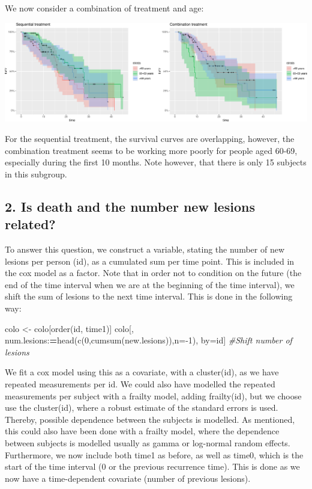 \documentclass[
  11pt,
]{article}
\newenvironment{Shaded}{\begin{snugshade}}{\end{snugshade}}
\newcommand{\AttributeTok}[1]{\textcolor[rgb]{0.77,0.63,0.00}{#1}}
\newcommand{\CommentTok}[1]{\textcolor[rgb]{0.56,0.35,0.01}{\textit{#1}}}
\newcommand{\DecValTok}[1]{\textcolor[rgb]{0.00,0.00,0.81}{#1}}
\newcommand{\ErrorTok}[1]{\textcolor[rgb]{0.64,0.00,0.00}{\textbf{#1}}}
\newcommand{\FunctionTok}[1]{\textcolor[rgb]{0.00,0.00,0.00}{#1}}
\newcommand{\NormalTok}[1]{#1}
\newcommand{\OtherTok}[1]{\textcolor[rgb]{0.56,0.35,0.01}{#1}}
\newcommand{\SpecialCharTok}[1]{\textcolor[rgb]{0.00,0.00,0.00}{#1}}
\begin{document}
We now consider a combination of treatment and age:

\includegraphics{Exam2021_PracticalPart_files/figure-latex/unnamed-chunk-9-1.pdf}

For the sequential treatment, the survival curves are overlapping,
however, the combination treatment seems to be working more poorly for
people aged 60-69, especially during the first 10 months. Note however,
that there is only 15 subjects in this subgroup.

\hypertarget{is-death-and-the-number-new-lesions-related}{%
\subsection{2. Is death and the number new lesions
related?}\label{is-death-and-the-number-new-lesions-related}}

To answer this question, we construct a variable, stating the number of
new lesions per person (id), as a cumulated sum per time point. This is
included in the cox model as a factor. Note that in order not to
condition on the future (the end of the time interval when we are at the
beginning of the time interval), we shift the sum of lesions to the next
time interval. This is done in the following way:

\begin{Shaded}
\begin{Highlighting}[]
\NormalTok{colo }\OtherTok{\textless{}{-}}\NormalTok{ colo[}\FunctionTok{order}\NormalTok{(id, time1)]}
\NormalTok{colo[, num.lesions}\SpecialCharTok{:}\ErrorTok{=}\FunctionTok{head}\NormalTok{(}\FunctionTok{c}\NormalTok{(}\DecValTok{0}\NormalTok{,}\FunctionTok{cumsum}\NormalTok{(new.lesions)),}\AttributeTok{n=}\SpecialCharTok{{-}}\DecValTok{1}\NormalTok{), by}\OtherTok{=}\NormalTok{id] }\CommentTok{\#Shift number of lesions}
\end{Highlighting}
\end{Shaded}

We fit a cox model using this as a covariate, with a cluster(id), as we
have repeated measurements per id. We could also have modelled the
repeated measurements per subject with a frailty model, adding
frailty(id), but we choose use the cluster(id), where a robust estimate
of the standard errors is used. Thereby, possible dependence between the
subjects is modelled. As mentioned, this could also have been done with
a frailty model, where the dependence between subjects is modelled
usually as gamma or log-normal random effects. Furthermore, we now
include both time1 as before, as well as time0, which is the start of
the time interval (0 or the previous recurrence time). This is done as
we now have a time-dependent covariate (number of previous lesions).
\end{document}

